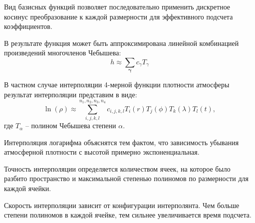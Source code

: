 Вид базисных функций позволяет последовательно
применить дискретное косинус преобразование к каждой размерности для эффективного подсчета
коэффициентов. 

В результате функция может быть аппроксимирована линейной комбинацией произведений
многочленов Чебышева:
\begin{equation*}
    h \approx \sum_{\mathbf{\gamma}} c_{\gamma} T_\gamma
\end{equation*}

В частном случае интерполяции 4-мерной функции плотности атмосферы
результат интерполяции представим в виде:
\begin{equation*}
    \ln(\rho) \approx \sum_{i,j,k,l}^{n_1, n_2, n_3, n_4} 
    c_{i,j,k,l} T_i(r) T_j(\phi) T_k (\lambda) T_l (t),
\end{equation*}
где $T_\alpha$ -- полином Чебышева степени $\alpha$.

Интерполяция логарифма объяснятся тем фактом, что зависимость убывания
атмосферной плотности с высотой примерно экспоненциальная.

Точность интерполяции определяется количеством ячеек, на которое было разбито пространство
и максимальной степенью полиномов по размерности для каждой ячейки.

Скорость интерполяции зависит от конфигурации интерполянта. Чем больше степени полиномов в
каждой ячейке, тем сильнее увеличивается время подсчета.
\newpage